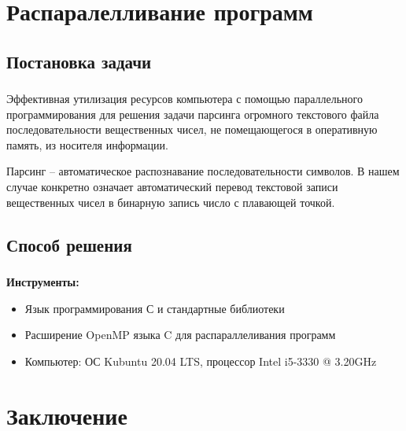 \section{Распаралелливание программ}


\subsection{Постановка задачи}
\begin{frame}
\frametitle{\insertsection}
\framesubtitle{\insertsubsection}

Эффективная утилизация ресурсов компьютера с помощью параллельного программирования
для решения задачи парсинга огромного текстового файла последовательности вещественных чисел,
не помещающегося в оперативную память, из носителя информации.

Парсинг -- автоматическое распознавание последовательности символов.
В нашем случае конкретно означает автоматический перевод текстовой записи вещественных чисел
в бинарную запись число с плавающей точкой.
\end{frame}


\subsection{Способ решения}


\begin{frame}
\frametitle{\insertsection}
\framesubtitle{\insertsubsection}

\textbf{Инструменты:}
\begin{itemize}
    \item Язык программирования С и стандартные библиотеки
    \item Расширение OpenMP языка C для распараллеливания программ 
    \item Компьютер: ОС Kubuntu 20.04 LTS, процессор  Intel i5-3330 @ 3.20GHz
\end{itemize}
\end{frame}


\section{Заключение}

